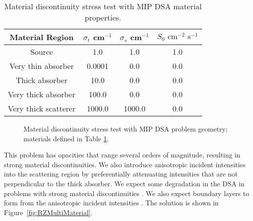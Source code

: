 \documentclass[12pt]{article}
\begin{document}
\begin{table}[!htb]
\centering
{\renewcommand{\arraystretch}{1.5}
\begin{tabular}{|c|c|c|c|}
\hline
Material Region & $\sigma_t$ cm$^{-1}$ & $\sigma_s$ cm$^{-1}$ & $S_0 \text{ cm}^{-2} \text{ s}^{-1}$ \\\hline
Source & 1.0 & 1.0 & 1.0 \\
Very thin absorber & 0.0001 & 0.0 & 0.0 \\
Thick absorber & 10.0 & 0.0 & 0.0 \\
Very thick absorber & 100.0 & 0.0 & 0.0 \\
Very thick scatterer & 1000.0 & 1000.0 & 0.0 \\
\hline
\end{tabular}}
\caption{Material discontinuity stress test with MIP DSA material properties.}
\label{tab:MaterialDiscontinuityProperties}
\end{table}

\begin{figure}[!hp]
\centering
{}
\caption{Material discontinuity stress test with MIP DSA problem geometry; materials defined in Table \ref{tab:MaterialDiscontinuityProperties}.}
\label{fig:MaterialDiscontinuityMesh}
\end{figure}

This problem has opacities that range several orders of magnitude, resulting in strong material discontinuities. We also introduce anisotropic incident intensities into the scattering region by preferentially attenuating intensities that are not perpendicular to the thick absorber. We expect some degradation in the DSA in problems with strong material discontinuities \cite{WangDissertation}. We also expect boundary layers to form from the anisotropic incident intensities \cite{AdamsDFEMDiffLimit}. The solution is shown in Figure~\ref{fig:RZMultiMaterial}.
\end{document}
